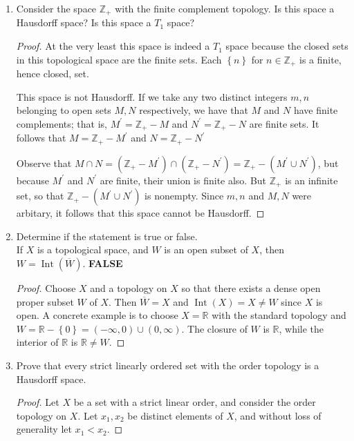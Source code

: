 \documentclass[11pt]{article}
\newcommand{\cbr}[1]{\left\{#1\right\}}
\DeclareMathOperator{\Int}{Int}
\begin{document}
\begin{enumerate}
\begin{proof}
      The only closed set containing $\cbr{1}$ is $\mathbb{Z}_+$, so that $\overline{\cbr{1}} = \mathbb{Z}_+$. Similarly, the only closed sets containing $\cbr{2}$ are $\mathbb{Z}_+$ and sets of the form $\mathbb{Z}_+ - W$, where $W$ contains only odd numbers and all of their divisors (which are also odd). Hence the intersection of all of these closed sets must be the set of positive even integers, so $\overline{\cbr{2}}$ is the set $2\mathbb{Z}_+$ (positive even integers).
    \end{proof}
    \item Consider the space $\mathbb{Z}_+$ with the finite complement topology. Is this space a Hausdorff space? Is this space a $T_1$ space?
    \begin{proof}
      At the very least this space is indeed a $T_1$ space because the closed sets in this topological space are the finite sets. Each $\cbr{n}$ for $n\in\mathbb{Z}_+$ is a finite, hence closed, set. 

      This space is not Hausdorff. If we take any two distinct integers $m,n$ belonging to open sets $M,N$ respectively, we have that $M$ and $N$ have finite complements; that is, $M^{\prime} = \mathbb{Z}_+ -M$ and $N^{\prime} = \mathbb{Z}_+ -N$ are finite sets. It follows that $M = \mathbb{Z}_+ -M^{\prime}$ and $N = \mathbb{Z}_+ -N^{\prime}$

      Observe that $M\cap N = (\mathbb{Z}_+ -M^{\prime})\cap (\mathbb{Z}_+ -N^{\prime}) = \mathbb{Z}_+ - (M^{\prime}\cup N^{\prime})$, but because $M^{\prime}$ and $N^{\prime}$ are finite, their union is finite also. But $\mathbb{Z}_+$ is an infinite set, so that $\mathbb{Z}_+-(M^{\prime} \cup N^{\prime})$ is nonempty. Since $m,n$ and $M,N$ were arbitary, it follows that this space cannot be Hausdorff. 
    \end{proof}
    \item Determine if the statement is true or false.\\
    If $X$ is a topological space, and $W$ is an open subset of $X$, then $W = \Int(\overline{W})$.
    \textbf{FALSE}
    \begin{proof}
      Choose $X$ and a topology on $X$ so that there exists a dense open proper subset $W$ of $X$. Then $\overline{W} = X$ and $\Int(X) = X \neq W$ since $X$ is open. A concrete example is to choose $X = \mathbb{R}$ with the standard topology and $W = \mathbb{R} - \cbr{0} = (-\infty, 0)\cup (0,\infty)$. The closure of $W$ is $\mathbb{R}$, while the interior of $\mathbb{R}$ is $\mathbb{R}\neq W$.
    \end{proof}
    \item Prove that every strict linearly ordered set with the order topology is a Hausdorff space.
    \begin{proof}
      Let $X$ be a set with a strict linear order, and consider the order topology on $X$. Let $x_1,x_2$ be distinct elements of $X$, and without loss of generality let $x_1 < x_2$.
      

\end{proof}
\end{enumerate}
\end{document}

